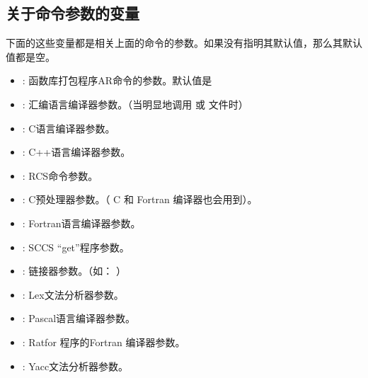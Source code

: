 \documentclass[a4paper,10pt]{sphinxmanual}
\begin{document}
\subsection{关于命令参数的变量}
\label{\detokenize{implicit_rules:id6}}
下面的这些变量都是相关上面的命令的参数。如果没有指明其默认值，那么其默认值都是空。
\begin{itemize}
\item {} 
 : 函数库打包程序AR命令的参数。默认值是 

\item {} 
 : 汇编语言编译器参数。（当明显地调用  或  文件时）

\item {} 
 : C语言编译器参数。

\item {} 
 : C++语言编译器参数。

\item {} 
 : RCS命令参数。

\item {} 
 : C预处理器参数。（ C 和 Fortran 编译器也会用到）。

\item {} 
 : Fortran语言编译器参数。

\item {} 
 : SCCS “get”程序参数。

\item {} 
 : 链接器参数。（如：  ）

\item {} 
 : Lex文法分析器参数。

\item {} 
 : Pascal语言编译器参数。

\item {} 
 : Ratfor 程序的Fortran 编译器参数。

\item {} 
 : Yacc文法分析器参数。

\end{itemize}
\end{document}
